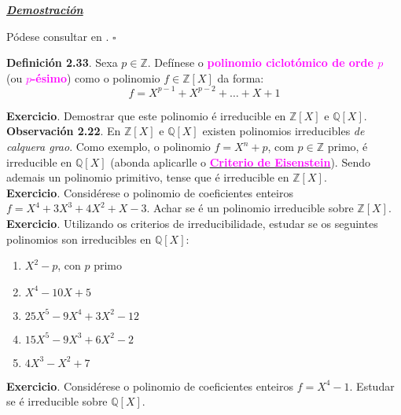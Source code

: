 \documentclass[twoside]{report}
\newcommand{\magbf}[1]{\textcolor{magenta}{\textbf{#1}}} %
\theoremstyle{mystyle}
\begin{document}
\vspace{2mm}

\noindent \textbf{\textit{\underline{Demostración}}}

\vspace{2mm}

\noindent Pódese consultar en \cite{gamboa}. $\square$\\

\vspace{3mm}

\noindent \textbf{Definición 2.33}. Sexa $p \in \mathbb{Z}$. Defínese o \magbf{polinomio ciclotómico de orde $p$} (ou \magbf{$p$-ésimo}) como o polinomio $f \in \mathbb{Z}[X]$ da forma:
$$f = X^{p-1} + X^{p-2} + \ldots + X + 1$$

\noindent \textbf{Exercicio}. Demostrar que este polinomio é irreducible en $\mathbb{Z}[X]$ e $ \mathbb{Q}[X]$.\\

\noindent \textbf{Observación 2.22}. En $\mathbb{Z}[X]$ e $\mathbb{Q}[X]$ existen polinomios irreducibles \textit{de calquera grao}. Como exemplo, o polinomio $f = X^{n} + p$, com $p \in \mathbb{Z}$ primo, é irreducible en $\mathbb{Q}[X]$ (abonda aplicarlle o \hyperref[prop2.26]{\magbf{Criterio de Eisenstein}}). Sendo ademais un polinomio primitivo, tense que é irreducible en $\mathbb{Z}[X]$.\\

\noindent \textbf{Exercicio}. Considérese o polinomio de coeficientes enteiros $f = X^{4} + 3X^{3} + 4X^{2} + X -3$. Achar se é un polinomio irreducible sobre $\mathbb{Z}[X]$.\\

\noindent \textbf{Exercicio}. Utilizando os criterios de irreducibilidade, estudar se os seguintes polinomios son irreducibles en $\mathbb{Q}[X]$:
\begin{enumerate}
    \item $X^{2} - p$, con $p$ primo
    \item $X^{4} - 10X + 5$
    \item $25X^{5} - 9X^{4} + 3X^{2} - 12$
    \item $15X^{5} - 9X^{3} + 6X^{2} - 2$
    \item $4X^{3} - X^{2} + 7$
\end{enumerate}

\noindent \textbf{Exercicio}. Considérese o polinomio de coeficientes enteiros $f = X^{4} - 1$. Estudar se é irreducible sobre $\mathbb{Q}[X]$.\\
\end{document}
